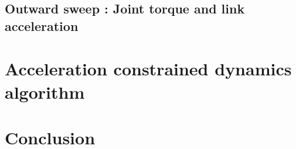 \subsection{Outward sweep : Joint torque and link acceleration }

\section{Acceleration constrained dynamics algorithm}

\section{Conclusion}


